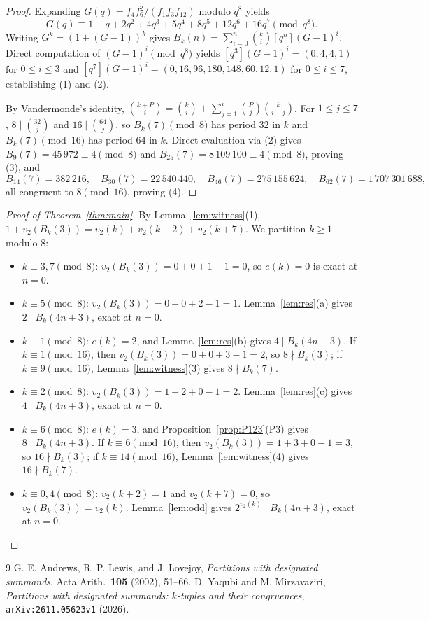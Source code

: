 \documentclass[11pt]{article}
\begin{document}
\begin{proof}
Expanding $G(q) = f_4 f_6^2 / (f_1 f_3 f_{12})$ modulo $q^8$ yields
\[
G(q) \equiv 1 + q + 2q^2 + 4q^3 + 5q^4 + 8q^5 + 12q^6 + 16q^7 \pmod{q^8}.
\]
Writing $G^k = (1 + (G-1))^k$ gives $B_k(n) = \sum_{i=0}^n \binom{k}{i} [q^n](G-1)^i$. Direct computation of $(G-1)^i \pmod{q^8}$ yields $[q^3](G-1)^i = (0, 4, 4, 1)$ for $0 \le i \le 3$ and $[q^7](G-1)^i = (0, 16, 96, 180, 148, 60, 12, 1)$ for $0 \le i \le 7$, establishing (1) and (2).

By Vandermonde's identity, $\binom{k+P}{i} = \binom{k}{i} + \sum_{j=1}^i \binom{P}{j}\binom{k}{i-j}$. For $1 \le j \le 7$, $8 \mid \binom{32}{j}$ and $16 \mid \binom{64}{j}$, so $B_k(7) \pmod 8$ has period $32$ in $k$ and $B_k(7) \pmod{16}$ has period $64$ in $k$. Direct evaluation via (2) gives $B_9(7) = 45\,972 \equiv 4 \pmod 8$ and $B_{25}(7) = 8\,109\,100 \equiv 4 \pmod 8$, proving (3), and
\[
B_{14}(7) = 382\,216,\quad B_{30}(7) = 22\,540\,440,\quad B_{46}(7) = 275\,155\,624,\quad B_{62}(7) = 1\,707\,301\,688,
\]
all congruent to $8 \pmod{16}$, proving (4).
\end{proof}

\begin{proof}[Proof of Theorem~\ref{thm:main}]
By Lemma~\ref{lem:witness}(1), $1 + v_2(B_k(3)) = v_2(k) + v_2(k+2) + v_2(k+7)$. We partition $k \ge 1$ modulo $8$:
\begin{itemize}
\item $k \equiv 3, 7 \pmod 8$: $v_2(B_k(3)) = 0 + 0 + 1 - 1 = 0$, so $e(k) = 0$ is exact at $n = 0$.
\item $k \equiv 5 \pmod 8$: $v_2(B_k(3)) = 0 + 0 + 2 - 1 = 1$. Lemma~\ref{lem:res}(a) gives $2 \mid B_k(4n+3)$, exact at $n = 0$.
\item $k \equiv 1 \pmod 8$: $e(k) = 2$, and Lemma~\ref{lem:res}(b) gives $4 \mid B_k(4n+3)$. If $k \equiv 1 \pmod{16}$, then $v_2(B_k(3)) = 0 + 0 + 3 - 1 = 2$, so $8 \nmid B_k(3)$; if $k \equiv 9 \pmod{16}$, Lemma~\ref{lem:witness}(3) gives $8 \nmid B_k(7)$.
\item $k \equiv 2 \pmod 8$: $v_2(B_k(3)) = 1 + 2 + 0 - 1 = 2$. Lemma~\ref{lem:res}(c) gives $4 \mid B_k(4n+3)$, exact at $n = 0$.
\item $k \equiv 6 \pmod 8$: $e(k) = 3$, and Proposition~\ref{prop:P123}(P3) gives $8 \mid B_k(4n+3)$. If $k \equiv 6 \pmod{16}$, then $v_2(B_k(3)) = 1 + 3 + 0 - 1 = 3$, so $16 \nmid B_k(3)$; if $k \equiv 14 \pmod{16}$, Lemma~\ref{lem:witness}(4) gives $16 \nmid B_k(7)$.
\item $k \equiv 0, 4 \pmod 8$: $v_2(k+2) = 1$ and $v_2(k+7) = 0$, so $v_2(B_k(3)) = v_2(k)$. Lemma~\ref{lem:odd} gives $2^{v_2(k)} \mid B_k(4n+3)$, exact at $n = 0$. \qedhere
\end{itemize}
\end{proof}

\begin{thebibliography}{9}
 G. E. Andrews, R. P. Lewis, and J. Lovejoy, \emph{Partitions with designated summands}, Acta Arith.\ \textbf{105} (2002), 51--66.
 D. Yaqubi and M. Mirzavaziri, \emph{Partitions with designated summands: $k$-tuples and their congruences}, \texttt{arXiv:2611.05623v1} (2026).
\end{thebibliography}
\end{document}
